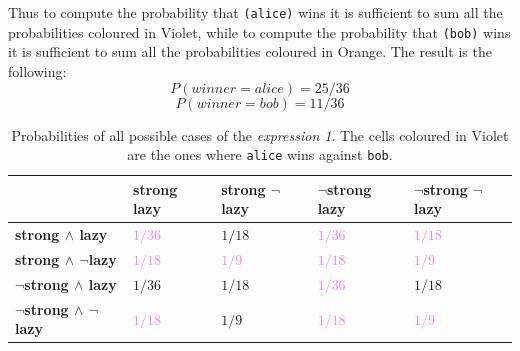 \begin{itemize}
        Thus to compute the probability that \texttt{\textquotesingle (alice)} wins it is sufficient to sum all the probabilities coloured in Violet,
        while to compute the probability that \texttt{\textquotesingle (bob)} wins it is sufficient to sum all the probabilities coloured in Orange.
        The result is the following:
        \[ P(winner = alice) = 25 / 36 \]
        \[ P(winner = bob) = 11 / 36 \]
        \begin{table}[H]
            \centering
            \bgroup
                \def\arraystretch{1.5}
                \begin{tabular}{| l | C{1.8cm} C{1.8cm} C{1.8cm} C{1.8cm}  |}                    
                    \hline
                     & 
                        \textbf{strong lazy} & \textbf{strong $\neg$lazy} & \textbf{$\neg$strong lazy} & \textbf{$\neg$strong $\neg$lazy} \\
                    \hline

                    \textbf{strong $\land$ lazy} & \textcolor{Violet}{$1/36$} & \textcolor{RedOrange}{$1/18$} & 
                        \textcolor{Violet}{$1/36$} & \textcolor{Violet}{$1/18$} \\ 

                    \textbf{strong $\land$ $\neg$lazy} & \textcolor{Violet}{$1/18$} & \textcolor{Violet}{$1/9$} & 
                        \textcolor{Violet}{$1/18$} & \textcolor{Violet}{$1/9$} \\ 
                    
                    \textbf{$\neg$strong $\land$ lazy} & \textcolor{RedOrange}{$1/36$} & \textcolor{RedOrange}{$1/18$} & 
                        \textcolor{Violet}{$1/36$} & \textcolor{RedOrange}{$1/18$} \\ 
                    
                    \textbf{$\neg$strong $\land$ $\neg$lazy} & \textcolor{Violet}{$1/18$} & \textcolor{RedOrange}{$1/9$} & 
                        \textcolor{Violet}{$1/18$} & \textcolor{Violet}{$1/9$} \\
                    \hline
                \end{tabular}
            \egroup
            \caption{
                Probabilities of all possible cases of the \textit{expression 1}. The cells coloured in Violet are the ones where
                \texttt{\textquotesingle alice} wins against \texttt{\textquotesingle bob}.
            }
            \label{tab:exp-1}
        \end{table}
     

\end{itemize}
